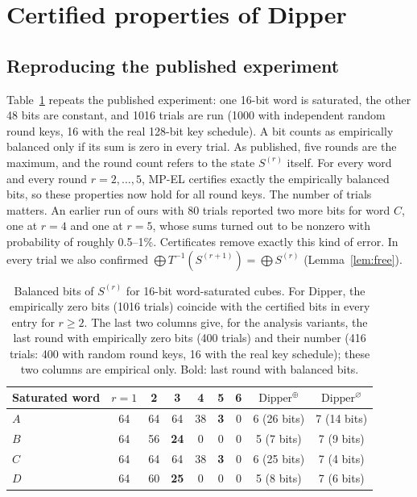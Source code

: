 \documentclass[11pt,a4paper]{article}
\theoremstyle{definition}
\theoremstyle{remark}
\newcommand{\MPEL}{\textsf{MP-EL}}
\begin{document}
\section{Certified properties of Dipper}\label{sec:results}

\subsection{Reproducing the published experiment}
Table~\ref{tab:words} repeats the published experiment: one 16-bit word is saturated, the other 48 bits are constant, and 1016 trials are run (1000 with independent random round keys, 16 with the real 128-bit key schedule). A bit counts as empirically balanced only if its sum is zero in every trial. As published, five rounds are the maximum, and the round count refers to the state $S^{(r)}$ itself. For every word and every round $r=2,\dots,5$, \MPEL{} certifies exactly the empirically balanced bits, so these properties now hold for all round keys. The number of trials matters. An earlier run of ours with 80 trials reported two more bits for word $C$, one at $r=4$ and one at $r=5$, whose sums turned out to be nonzero with probability of roughly 0.5--1\%. Certificates remove exactly this kind of error. In every trial we also confirmed $\bigoplus T^{-1}(S^{(r+1)})=\bigoplus S^{(r)}$ (Lemma~\ref{lem:free}).

\begin{table}[t]\centering
\caption{Balanced bits of $S^{(r)}$ for 16-bit word-saturated cubes. For Dipper, the empirically zero bits (1016 trials) coincide with the certified bits in every entry for $r\ge2$. The last two columns give, for the analysis variants, the last round with empirically zero bits (400 trials) and their number (416 trials: 400 with random round keys, 16 with the real key schedule); these two columns are empirical only. Bold: last round with balanced bits.}\label{tab:words}
\begin{tabular}{lcccccc|cc}
\toprule
Saturated word & $r{=}1$ & 2 & 3 & 4 & 5 & 6 & $\mathrm{Dipper}^{\oplus}$ & $\mathrm{Dipper}^{\varnothing}$\\
\midrule
$A$ & 64 & 64 & 64 & 38 & \textbf{3} & 0 & 6 (26 bits) & 7 (14 bits)\\
$B$ & 64 & 56 & \textbf{24} & 0 & 0 & 0 & 5 (7 bits) & 7 (9 bits)\\
$C$ & 64 & 64 & 64 & 38 & \textbf{3} & 0 & 6 (25 bits) & 7 (4 bits)\\
$D$ & 64 & 60 & \textbf{25} & 0 & 0 & 0 & 5 (8 bits) & 7 (6 bits)\\
\bottomrule
\end{tabular}
\end{table}
\end{document}
